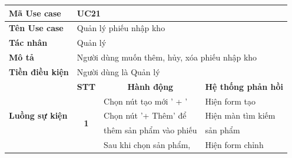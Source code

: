 \documentclass[../DoAn.tex]{subfiles}
\begin{document}
\begin{table}[H]
    \begin{tabular}{|l|c|l|l|}
        \hline
        \textbf{Mã Use case}                     & \multicolumn{3}{l|}{UC21}                                                                                                                                        \\ \hline
        \textbf{Tên Use case}                    & \multicolumn{3}{l|}{Quản lý phiếu nhập kho}                                                                                                                      \\ \hline
        \textbf{Tác nhân}                        & \multicolumn{3}{l|}{Quản lý}                                                                                                                                     \\ \hline
        \textbf{Mô tả}                           & \multicolumn{3}{l|}{Người dùng muốn thêm, hủy, xóa phiếu nhập kho}                                                                                               \\ \hline
        \textbf{Tiền điều kiện}                  & \multicolumn{3}{l|}{Người dùng là Quản lý}                                                                                                                       \\ \hline
        \multirow{14}{*}{\textbf{Luồng sự kiện}} & \multicolumn{1}{c|}{\textbf{STT}}                                  & \multicolumn{1}{c|}{\textbf{Hành động}}   & \multicolumn{1}{c|}{\textbf{Hệ thống phản hồi}} \\ \cline{2-4}
                                                 & \multirow{10}{*}{\textbf{1}}                                       & Chọn nút tạo mới ' + '                    & Hiện form tạo                                   \\ \cline{3-4}
                                                 &                                                                    & Chọn nút '+ Thêm' để                      & Hiện màn tìm kiếm                               \\
                                                 &                                                                    & thêm sản phẩm vào phiếu                   & sản phẩm                                        \\ \cline{3-4}
                                                 &                                                                    & Sau khi chọn sản phẩm,                    & Hiện form chỉnh                                 \\

\end{tabular}
\end{table}
\end{document}
